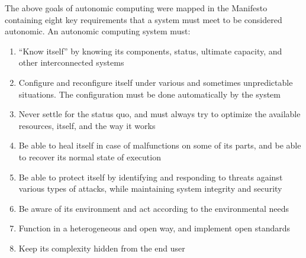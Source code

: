 The above goals of autonomic computing were mapped in the Manifesto \cite{IBM:AutonomicManifesto} containing eight key requirements that a system must meet to be considered autonomic. An autonomic computing system must:

\begin{enumerate}
	\item ``Know itself'' by knowing its components, status, ultimate capacity, and other interconnected systems
	\item Configure and reconfigure itself under various and sometimes unpredictable situations. The configuration must be done automatically by the system
	\item Never settle for the status quo, and must always try to optimize the available resources, itself, and the way it works
	\item Be able to heal itself in case of malfunctions on some of its parts, and be able to recover its normal state of execution
	\item Be able to protect itself by identifying and responding to threats against various types of attacks, while maintaining system integrity and security
	\item Be aware of its environment and act according to the environmental needs
	\item Function in a heterogeneous and open way, and implement open standards
	\item Keep its complexity hidden from the end user
\end{enumerate}

